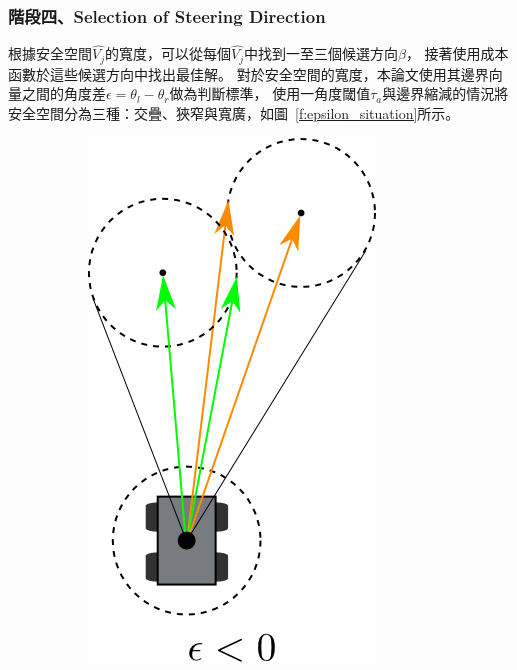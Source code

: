 \subsubsection{階段四、Selection of Steering Direction}
根據安全空間$\hat{V_j}$的寬度，可以從每個$\hat{V_j}$中找到一至三個候選方向$\beta$，
接著使用成本函數於這些候選方向中找出最佳解。
對於安全空間的寬度，本論文使用其邊界向量之間的角度差$\epsilon = \theta_l - \theta_r$做為判斷標準，
使用一角度閾值$\tau_a$與邊界縮減的情況將安全空間分為三種：交疊、狹窄與寬廣，如圖~\ref{f:epsilon_situation}所示。
\begin{figure}[h!]
	\centering
	\begin{subfigure}[t]{0.25\textwidth}
		\includegraphics[width=\textwidth]{figures/algorithm/epsilon_situation_1}

\end{subfigure}
\end{figure}
